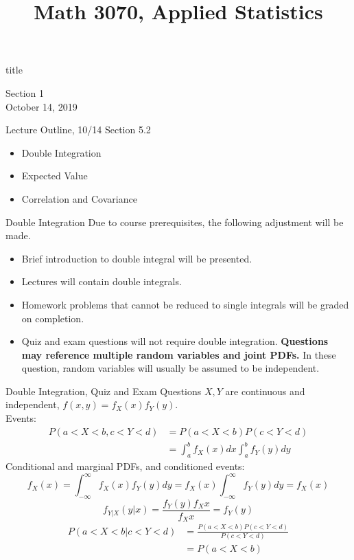 \documentclass[t,handout]{beamer}
\title{Math 3070, Applied Statistics}
\newcommand{\nl}[1]{\vspace{#1 em}}
\begin{document}
\begin{frame}[c]
    \begin{beamercolorbox}[rounded=true,wd=\textwidth,center]{title}
        \inserttitle
    \end{beamercolorbox}
    \begin{center}
        Section 1\\
        \nl{0.5}
        October 14, 2019
    \end{center}
\end{frame}
\begin{frame}[c]{Lecture Outline, 10/14}
    Section 5.2
    \begin{itemize}
        \item Double Integration
        \item Expected Value
        \item Correlation and Covariance
    \end{itemize}
\end{frame}
\begin{frame}{Double Integration}
    Due to course prerequisites, the following adjustment will be made.
    \begin{itemize}
        \item Brief introduction to double integral will be presented.
        \item Lectures will contain double integrals.
        \item Homework problems that cannot be reduced to single integrals will be graded on completion.
        \item Quiz and exam questions will not require double integration. \textbf{Questions may reference multiple random variables and joint PDFs.} In these question, random variables will usually be assumed to be independent.
    \end{itemize}
\end{frame}
\begin{frame}{Double Integration, Quiz and Exam Questions}
    $X,Y$ are continuous and independent, $f(x,y)=f_X(x)f_Y(y)$.\\
    Events:
    \begin{align*}
        P(a<X<b,c<Y<d) & = P(a<X<b) P(c<Y<d)                           \\
                       & = \int_{a}^b f_X (x) dx \int_{a}^b f_Y (y) dy
    \end{align*}
    Conditional and marginal PDFs, and conditioned events:
    $$ f_{X}(x) = \int_{-\infty}^\infty f_X(x)f_Y(y) dy = f_X(x) \int_{-\infty}^\infty f_Y(y) dy =f_X(x)$$
    $$ f_{Y|X}(y|x) = \frac{f_Y(y)f_X{x}}{f_X{x}} = f_Y(y) $$
    \begin{align*}
        P(a<X<b|c<Y<d) & = \frac{P(a<X<b)P(c<Y<d)}{P(c<Y<d)} \\ & = P(a<X<b)\\
    \end{align*}
\end{frame}
\end{document}
